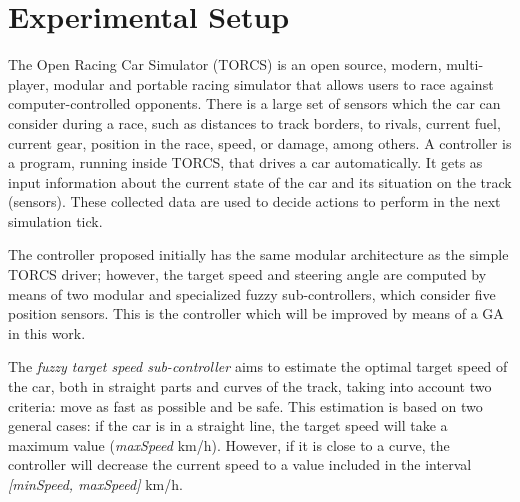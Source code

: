 \documentclass[conference]{IEEEtran}
\begin{document}
\section{Experimental Setup}
\label{sec:torcs}

The Open Racing Car Simulator (TORCS) \cite{WebTORCS} is an open source, modern, multi-player, modular and portable racing simulator that allows users to race against computer-controlled opponents.
There is a large set of sensors \cite{Torcs3} which the car can consider during a race, such as distances to track borders, to rivals, current fuel, current gear, position in the race, speed, or damage, among others.
A controller is a program, running inside TORCS, that 
drives a car automatically. It gets as input information about the current state of
the car and its situation on the track (sensors). These collected data
are used to decide actions to perform in the next simulation tick.  


The controller proposed initially \cite{evo17} has the same modular
architecture as the simple TORCS driver; however, the target speed and
steering angle are computed by means of two modular and specialized
fuzzy sub-controllers, which consider five position sensors. This is
the controller which will be improved by means of a GA in this
work.

The {\em fuzzy target speed sub-controller} aims to estimate the
optimal target speed of the car, both in straight parts and curves of
the track, taking into account two criteria: move as fast as possible
and be safe. This estimation is based on two general cases: if the car
is in a straight line, the target speed will take a maximum value
(\textit{maxSpeed} km/h). However, if it is close to a curve, the
controller will decrease the current speed to a value included in the
interval \textit{[minSpeed, maxSpeed]} km/h. 
\end{document}
